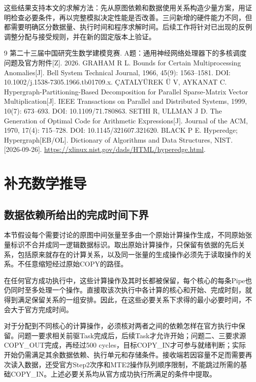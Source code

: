 \documentclass[anonymous,notoc]{gmcm2026}
\begin{document}
这些结果支持本文的求解方法：先从原图依赖和数据使用关系构造少量方案，用证明检查必要条件，再以完整模拟决定性能是否改善。三问新增的硬件能力不同，但都需要明确区分数据量、执行时间和程序求解时间。后续工作将针对已出现的反例调整分配与接受规则，并在新的固定版本上验证。


\FloatBarrier
\begin{thebibliography}{9}
 第二十三届中国研究生数学建模竞赛. A题：通用神经网络处理器下的多核调度问题及官方附件[Z]. 2026.
 GRAHAM R L. Bounds for Certain Multiprocessing Anomalies[J]. Bell System Technical Journal, 1966, 45(9): 1563--1581. DOI: 10.1002/j.1538-7305.1966.tb01709.x.
 ÇATALYÜREK Ü V, AYKANAT C. Hypergraph-Partitioning-Based Decomposition for Parallel Sparse-Matrix Vector Multiplication[J]. IEEE Transactions on Parallel and Distributed Systems, 1999, 10(7): 673--693. DOI: 10.1109/71.780863.
 SETHI R, ULLMAN J D. The Generation of Optimal Code for Arithmetic Expressions[J]. Journal of the ACM, 1970, 17(4): 715--728. DOI: 10.1145/321607.321620.
 BLACK P E. Hyperedge; Hypergraph[EB/OL]. Dictionary of Algorithms and Data Structures, NIST. [2026-09-26]. \url{https://xlinux.nist.gov/dads/HTML/hyperedge.html}.
\end{thebibliography}

\appendix
\setcounter{section}{1}
\section{补充数学推导}

\subsection{数据依赖所给出的完成时间下界}

本节假设每个需要讨论的原图中间张量至多由一个原始计算操作生成，不同原始张量标识不合并成同一逻辑数据标识。取出原始计算操作，只保留有依据的先后关系，包括原来就存在的计算关系，以及同一张量的生成操作必须先于读取操作的关系。不任意缩短经过原始COPY的路径。

在任何官方成功执行中，这些计算操作及其时长都被保留，每个核心的每条Pipe也仍同时至多处理一个操作。直接取该次执行中各计算的核心和开始、完成时刻，就得到满足保留关系的一组安排。因此，在这些必要关系下求得的最小必要时间，不会大于官方完成时间。

对于分配到不同核心的计算操作，必须核对两者之间的依赖怎样在官方执行中保留。问题一要求相关前驱Task完成后，后续Task才允许开始；问题二、三要求源COPY\_OUT完成，再经过500 cycles，目标COPY\_IN才可参与就绪判断；实际开始仍需满足其余数据依赖、执行单元和存储条件。接收端若因容量不足而需要再次读入数据，还受官方Step2次序和MTE2操作队列顺序限制，不能跳过所需的基础COPY\_IN。上述必要关系均从官方成功执行所满足的条件中提取。
\end{document}
